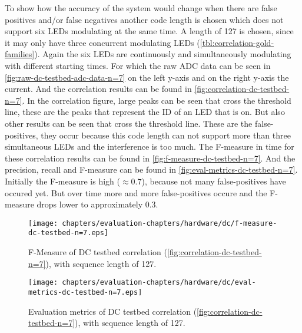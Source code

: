 To show how the accuracy of the system would change when there are false positives and/or false negatives another code length is chosen which does not support six LEDs modulating at the same time.
A length of 127 is chosen, since it may only have three concurrent modulating LEDs (\autoref{tbl:correlation-gold-families}).
Again the six LEDs are continuously and simultaneously modulating with different starting times.
For which the raw ADC data can be seen in \autoref{fig:raw-dc-testbed-adc-data-n=7} on the left y-axis and on the right y-axis the current.
And the correlation results can be found in \autoref{fig:correlation-dc-testbed-n=7}.
In the correlation figure, large peaks can be seen that cross the threshold line, these are the peaks that represent the ID of an LED that is on.
But also other results can be seen that cross the threshold line.
These are the false-positives, they occur because this code length can not support more than three simultaneous LEDs and the interference is too much.
The F-measure in time for these correlation results can be found in \autoref{fig:f-measure-dc-testbed-n=7}.
And the precision, recall and F-measure can be found in \autoref{fig:eval-metrics-dc-testbed-n=7}.
Initially the F-measure is high ($\approx 0.7$), because not many false-positives have occured yet.
But over time more and more false-positives occure and the F-measure drops lower to approximately 0.3.





\begin{figure}[ht]
  \centering
  \begin{minipage}[b]{0.49\textwidth}
  	\texttt{[image: chapters/evaluation-chapters/hardware/dc/f-measure-dc-testbed-n=7.eps]}
  	\caption{F-Measure of DC testbed correlation (\autoref{fig:correlation-dc-testbed-n=7}), with sequence length of 127.}
  	\label{fig:f-measure-dc-testbed-n=7}
  \end{minipage}
  \hfill
  \begin{minipage}[b]{0.49\textwidth}
    \texttt{[image: chapters/evaluation-chapters/hardware/dc/eval-metrics-dc-testbed-n=7.eps]}
    \caption{Evaluation metrics of DC testbed correlation (\autoref{fig:correlation-dc-testbed-n=7}), with sequence length of 127.}
    \label{fig:eval-metrics-dc-testbed-n=7}
  \end{minipage}
\end{figure}